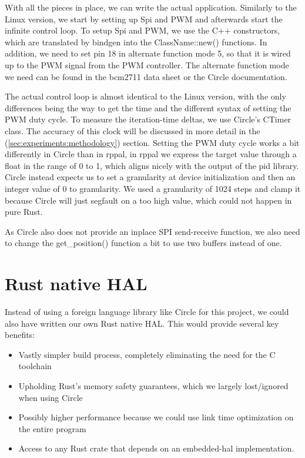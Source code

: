 With all the pieces in place, we can write the actual application.
Similarly to the Linux version, we start by setting up Spi and PWM and afterwards start the infinite control loop.
To setup Spi and PWM, we use the C++ constructors, which are translated by bindgen into the ClassName::new() functions.
In addition, we need to set pin 18 in alternate function mode 5, so that it is wired up to the PWM signal from the PWM controller.
The alternate function mode we need can be found in the bcm2711 data sheet or the Circle documentation.



The actual control loop is almost identical to the Linux version, with the only differences being the way to get the time and the different syntax of setting the PWM duty cycle.
To measure the iteration-time deltas, we use Circle's CTimer class. The accuracy of this clock will be discussed in more detail in the  (\ref{sec:experiments:methodology}) section.
Setting the PWM duty cycle works a bit differently in Circle than in rppal,
in rppal we express the target value through a float in the range of 0 to 1,
which aligns nicely with the output of the pid library.
Circle instead expects us to set a granularity at device initialization and then an integer value of 0 to granularity.
We used a granularity of 1024 steps and clamp it because Circle will just segfault on a too high value, which could not happen in pure Rust.



As Circle also does not provide an inplace SPI send-receive function, we also need to change the get\_position() function a bit to use two buffers instead of one.


\section{Rust native HAL}
\label{sec:concept_and_implementation:hal}

Instead of using a foreign language library like Circle for this project, we could also have written our own Rust native HAL.
This would provide several key benefits:
\begin{itemize}
    \item Vastly simpler build process, completely eliminating the need for the C toolchain
    \item Upholding Rust's memory safety guarantees, which we largely lost/ignored when using Circle
    \item Possibly higher performance because we could use link time optimization on the entire program
    \item Access to any Rust crate that depends on an embedded-hal implementation.
\end{itemize}

